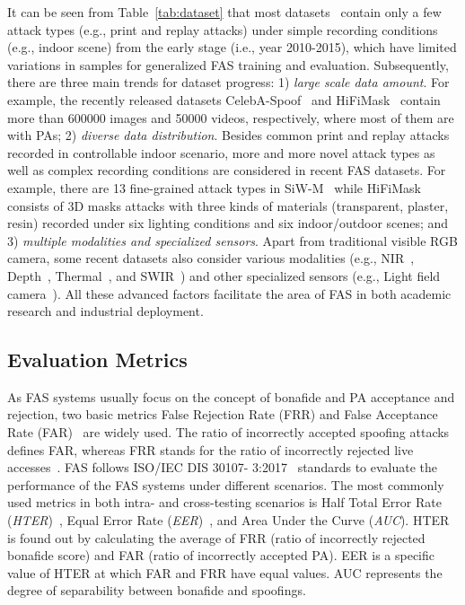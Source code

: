 \documentclass[10pt,journal,compsoc]{IEEEtran}
\begin{document}
It can be seen from Table~\ref{tab:dataset} that most datasets~\cite{tan2010face,peixoto2011face,Zhang2012A,ReplayAttack,kose2013shape,wen2015face,pinto2015using} contain only a few attack types (e.g., print and replay attacks) under simple recording conditions (e.g., indoor scene) from the early stage (i.e., year 2010-2015), which have limited variations in samples for generalized FAS training and evaluation. Subsequently, there are three main trends for dataset progress: 1) \textit{large scale data amount}. For example, the recently released datasets CelebA-Spoof~\cite{zhang2020celeba} and HiFiMask~\cite{liu2021contrastive} contain more than 600000 images and 50000 videos, respectively, where most of them are with PAs; 2) \textit{diverse data distribution}. Besides common print and replay attacks recorded in controllable indoor scenario, more and more novel attack types as well as complex recording conditions are considered in recent FAS datasets. For example, there are 13 fine-grained attack types in SiW-M~\cite{liu2019deep} while HiFiMask~\cite{liu2021contrastive} consists of 3D masks attacks with three kinds of materials (transparent, plaster, resin) recorded under six lighting conditions and six indoor/outdoor scenes; and 3) \textit{multiple modalities and specialized sensors}. Apart from traditional visible RGB camera, some recent datasets also consider various modalities (e.g., NIR~\cite{heusch2020deep,li2020casia,casiasurf,george2019biometric}, Depth~\cite{heusch2020deep,li2020casia,casiasurf,george2019biometric}, Thermal~\cite{heusch2020deep,george2019biometric}, and SWIR~\cite{heusch2020deep}) and other specialized sensors (e.g., Light field camera~\cite{raghavendra2015presentation,liu2019light}). All these advanced factors facilitate the area of FAS in both academic research and industrial deployment.   




\vspace{-0.8em}

\subsection{Evaluation Metrics}

As FAS systems usually focus on the concept of bonafide and PA acceptance and rejection, two basic metrics False Rejection Rate (FRR) and False Acceptance Rate (FAR)~\cite{galbally2012high} are widely used. The ratio of incorrectly accepted spoofing attacks defines FAR, whereas FRR stands for the ratio of incorrectly rejected live accesses~\cite{chingovska2014biometrics}. FAS follows ISO/IEC DIS 30107- 3:2017~\cite{iso2017information} standards to evaluate the performance of the FAS systems under different scenarios. The most commonly used metrics in both intra- and cross-testing scenarios is Half Total Error Rate (\textit{HTER})~\cite{chingovska2014biometrics}, Equal Error Rate (\textit{EER})~\cite{ramachandra2017presentation}, and Area Under the Curve (\textit{AUC}). HTER is found out by calculating the average of FRR (ratio of incorrectly rejected bonafide score) and FAR (ratio of incorrectly accepted PA). EER is a specific value of HTER at which FAR and FRR have equal values. AUC represents the degree of separability between bonafide and spoofings. 
\end{document}
